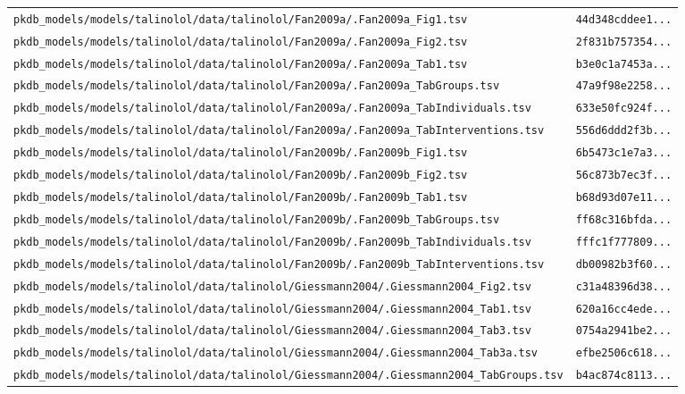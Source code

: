 \begin{longtable}{ll}
\texttt{pkdb\_models/models/talinolol/data/talinolol/Fan2009a/.Fan2009a\_Fig1.tsv} & \texttt{44d348cddee1...} \\
\texttt{pkdb\_models/models/talinolol/data/talinolol/Fan2009a/.Fan2009a\_Fig2.tsv} & \texttt{2f831b757354...} \\
\texttt{pkdb\_models/models/talinolol/data/talinolol/Fan2009a/.Fan2009a\_Tab1.tsv} & \texttt{b3e0c1a7453a...} \\
\texttt{pkdb\_models/models/talinolol/data/talinolol/Fan2009a/.Fan2009a\_TabGroups.tsv} & \texttt{47a9f98e2258...} \\
\texttt{pkdb\_models/models/talinolol/data/talinolol/Fan2009a/.Fan2009a\_TabIndividuals.tsv} & \texttt{633e50fc924f...} \\
\texttt{pkdb\_models/models/talinolol/data/talinolol/Fan2009a/.Fan2009a\_TabInterventions.tsv} & \texttt{556d6ddd2f3b...} \\
\texttt{pkdb\_models/models/talinolol/data/talinolol/Fan2009b/.Fan2009b\_Fig1.tsv} & \texttt{6b5473c1e7a3...} \\
\texttt{pkdb\_models/models/talinolol/data/talinolol/Fan2009b/.Fan2009b\_Fig2.tsv} & \texttt{56c873b7ec3f...} \\
\texttt{pkdb\_models/models/talinolol/data/talinolol/Fan2009b/.Fan2009b\_Tab1.tsv} & \texttt{b68d93d07e11...} \\
\texttt{pkdb\_models/models/talinolol/data/talinolol/Fan2009b/.Fan2009b\_TabGroups.tsv} & \texttt{ff68c316bfda...} \\
\texttt{pkdb\_models/models/talinolol/data/talinolol/Fan2009b/.Fan2009b\_TabIndividuals.tsv} & \texttt{fffc1f777809...} \\
\texttt{pkdb\_models/models/talinolol/data/talinolol/Fan2009b/.Fan2009b\_TabInterventions.tsv} & \texttt{db00982b3f60...} \\
\texttt{pkdb\_models/models/talinolol/data/talinolol/Giessmann2004/.Giessmann2004\_Fig2.tsv} & \texttt{c31a48396d38...} \\
\texttt{pkdb\_models/models/talinolol/data/talinolol/Giessmann2004/.Giessmann2004\_Tab1.tsv} & \texttt{620a16cc4ede...} \\
\texttt{pkdb\_models/models/talinolol/data/talinolol/Giessmann2004/.Giessmann2004\_Tab3.tsv} & \texttt{0754a2941be2...} \\
\texttt{pkdb\_models/models/talinolol/data/talinolol/Giessmann2004/.Giessmann2004\_Tab3a.tsv} & \texttt{efbe2506c618...} \\
\texttt{pkdb\_models/models/talinolol/data/talinolol/Giessmann2004/.Giessmann2004\_TabGroups.tsv} & \texttt{b4ac874c8113...} \\

\end{longtable}
